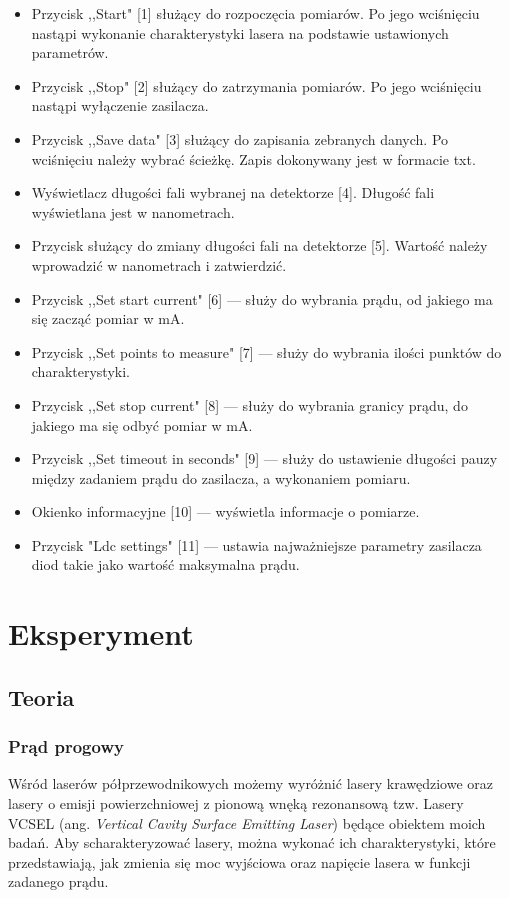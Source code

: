 \documentclass[a4paper, portrait,12pt]{mwrep}
\begin{document}
\begin{itemize}
\item Przycisk ,,Start" [1] służący do rozpoczęcia pomiarów. Po jego wciśnięciu nastąpi wykonanie charakterystyki lasera na podstawie ustawionych parametrów.
\item Przycisk ,,Stop" [2] służący do zatrzymania pomiarów. Po jego wciśnięciu nastąpi wyłączenie zasilacza.
\item Przycisk ,,Save data" [3] służący do zapisania zebranych danych. Po wciśnięciu należy wybrać ścieżkę. Zapis dokonywany jest w formacie txt.
\item Wyświetlacz długości fali wybranej na detektorze [4]. Długość fali wyświetlana jest w nanometrach.
\item Przycisk służący do zmiany długości fali na detektorze [5]. Wartość należy wprowadzić w nanometrach i zatwierdzić.
\item Przycisk ,,Set start current" [6] --- służy do wybrania prądu, od jakiego ma się zacząć pomiar w mA.
\item Przycisk ,,Set points to measure" [7] --- służy do wybrania ilości punktów do charakterystyki.
\item Przycisk ,,Set stop current" [8] --- służy do wybrania granicy prądu, do jakiego ma się odbyć pomiar w mA.
\item Przycisk ,,Set timeout in seconds" [9] --- służy do ustawienie długości pauzy między zadaniem prądu do zasilacza, a wykonaniem pomiaru.
\item Okienko informacyjne [10] --- wyświetla informacje o pomiarze.
\item Przycisk "Ldc settings" [11] --- ustawia najważniejsze parametry zasilacza diod takie jako wartość maksymalna prądu.
\end{itemize}
\chapter{Eksperyment} \label{Eksperyment}
\section{Teoria}
\subsection{Prąd progowy}
Wśród laserów półprzewodnikowych możemy wyróżnić lasery krawędziowe oraz lasery o emisji powierzchniowej z pionową wnęką rezonansową tzw. Lasery VCSEL (ang. \textit{Vertical Cavity Surface Emitting Laser}) będące obiektem moich badań. Aby scharakteryzować lasery, można wykonać ich charakterystyki, które przedstawiają, jak zmienia się moc wyjściowa oraz napięcie lasera w funkcji zadanego prądu.
\end{document}
